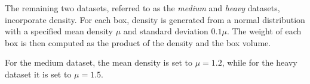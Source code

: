 The remaining two datasets, referred to as the \emph{medium} and \emph{heavy} datasets, incorporate density. For each box, density is generated from a normal distribution with a specified mean density $\mu$ and standard deviation $0.1\mu$. The weight of each box is then computed as the product of the density and the box volume.

For the medium dataset, the mean density is set to $\mu = 1.2$, while for the heavy dataset it is set to $\mu = 1.5$.



